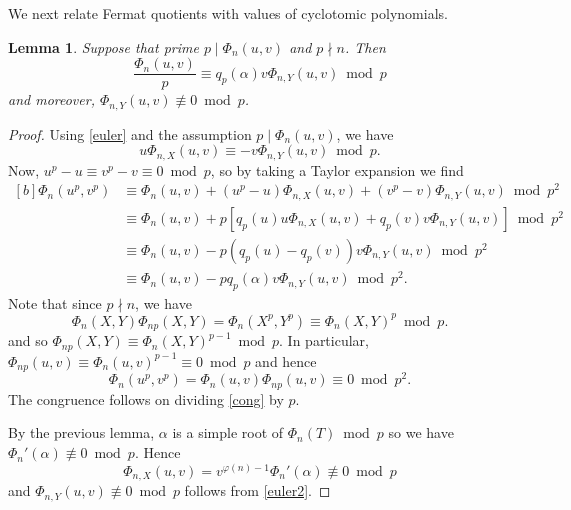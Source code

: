 \documentclass[12pt,reqno]{amsart}
\newtheorem{lemma}[theorem]{Lemma}
\theoremstyle{remark}
\begin{document}
We next relate Fermat quotients with values of cyclotomic polynomials. 
\begin{lemma}\label{conglem}
Suppose that prime $p\mid\Phi_n(u,v)$ and $p\nmid n$. Then
\[\dfrac{\Phi_{n}(u,v)}{p}\equiv q_p(\alpha)v\Phi_{n,Y}(u,v)\bmod p\] 
and moreover, $\Phi_{n,Y}(u,v)\not\equiv 0\bmod p$.
\end{lemma}
\begin{proof} 
Using \eqref{euler} and the assumption $p\mid\Phi_n(u,v)$, we have
\begin{equation}\label{euler2}
u\Phi_{n,X}(u,v)\equiv -v\Phi_{n,Y}(u,v)\bmod p.
\end{equation}
Now, $u^p-u\equiv v^p-v\equiv 0\bmod p$, so by taking a Taylor expansion we find
\begin{equation}\begin{aligned}[b]
\Phi_n(u^p,v^p) 
&\equiv \Phi_n(u,v)+(u^p-u)\Phi_{n,X}(u,v)+(v^p-v)\Phi_{n,Y}(u,v)\bmod p^2  \\
&\equiv \Phi_n(u,v)+p\left[q_p(u)u\Phi_{n,X}(u,v)+q_p(v)v\Phi_{n,Y}(u,v)\right]\bmod p^2 \\
&\equiv\Phi_n(u,v)-p\left(q_p(u)-q_p(v)\right)v\Phi_{n,Y}(u,v) \bmod p^2 \\
&\equiv\Phi_n(u,v)-pq_p(\alpha)v\Phi_{n,Y}(u,v)\bmod p^2. \label{cong}
\end{aligned}\end{equation}
Note that since $p\nmid n$, we have
\[\Phi_n(X,Y)\Phi_{np}(X,Y)=\Phi_n(X^p,Y^p)\equiv\Phi_n(X,Y)^p\bmod p.\]
and so $\Phi_{np}(X,Y)\equiv\Phi_n(X,Y)^{p-1}\bmod p$. 
In particular, $\Phi_{np}(u,v)\equiv\Phi_{n}(u,v)^{p-1}\equiv 0\bmod p$ and hence 
\[\Phi_n(u^p,v^p)=\Phi_n(u,v)\Phi_{np}(u,v)\equiv 0 \bmod p^2.\]
The congruence follows on dividing \eqref{cong} by $p$.
\medskip

By the previous lemma, $\alpha$ is a simple root of $\Phi_n(T)\bmod p$ so we have $\Phi_n'(\alpha)\not\equiv 0\bmod p$. Hence
\[\Phi_{n,X}(u,v)=v^{\varphi(n)-1}\Phi_n'(\alpha)\not\equiv 0\bmod p\] 
and $\Phi_{n,Y}(u,v)\not\equiv 0\bmod p$ follows from \eqref{euler2}.
\end{proof}
\medskip
\end{document}
